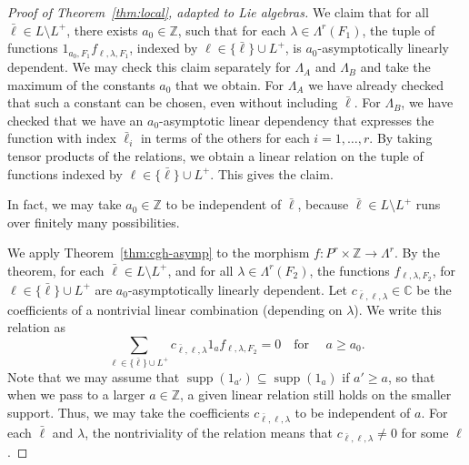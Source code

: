 \documentclass[12pt]{amsart}
\newcommand{\op}[1]{\operatorname{#1}}
\newcommand{\ring}[1]{{\mathbb #1}}
\theoremstyle{plain}
\theoremstyle{definition}
\begin{document}
\begin{proof}[Proof of Theorem~\ref{thm:local}, adapted to Lie algebras]
We claim that for all ${\bar\ell} \in L\setminus L^+$, there exists
$a_0\in\ring{Z}$, such that for each $\lambda\in \Lambda^r(F_1)$, the
tuple of functions $1_{a_0,F_1}f_{\ell,\lambda,F_1}$, indexed by
$\ell\in \{{\bar\ell}\}\cup L^+$, is $a_0$-asymptotically linearly
dependent.  We may check this claim separately for $\Lambda_A$ and
$\Lambda_B$ and take the maximum of the constants $a_0$ that we
obtain.  For $\Lambda_A$ we have already checked that such a constant
can be chosen, even without including $\bar\ell$.  For $\Lambda_B$, we
have checked that we have an $a_0$-asymptotic linear dependency that
expresses the function with index $\bar\ell_i$ in terms of the others
for each $i=1,\ldots,r$. By taking tensor products of the relations,
we obtain a linear relation on the tuple of functions indexed by $\ell\in
\{{\bar\ell}\}\cup L^+$.  This gives the claim.

In fact, we may take $a_0\in\ring{Z}$ to be independent of $\bar\ell$,
because ${\bar\ell}\in L\setminus L^+$ runs over finitely many
possibilities.

We apply Theorem~\ref{thm:cgh-asymp} to the morphism
$f:P^r\times\ring{Z}\to \Lambda^r$.  By the theorem, for each ${\bar\ell}\in
L\setminus L^+$, and for all $\lambda\in \Lambda^r({F_2})$, the
functions $f_{\ell,\lambda,F_2}$, for $\ell\in \{{\bar\ell}\}\cup L^+$ are
$a_0$-asymptotically linearly dependent.  Let $c_{{\bar\ell},\ell,\lambda}\in
\ring{C}$ be the coefficients of a nontrivial linear combination
(depending on $\lambda$).  We write this relation as
\begin{equation}\label{eqn:du}
\sum_{\ell\in \{{\bar\ell}\}\cup L^+} c_{{\bar\ell},\ell,\lambda}1_af_{\ell,\lambda,F_2}  =
0\quad\text{for }\quad a\ge a_0.
\end{equation}
Note that we may assume that
$\op{supp}(1_{a'})\subseteq\op{supp}(1_a)$ if $a'\ge a$, so that when
we pass to a larger $a\in\ring{Z}$, a given linear relation still
holds on the smaller support. Thus, we may take the coefficients
$c_{{\bar\ell},\ell,\lambda}$ to be independent of $a$.  For each
${\bar\ell}$ and $\lambda$, the nontriviality of the relation means
that $c_{{\bar\ell},\ell,\lambda}\ne 0$ for some $\ell$.


\end{proof}
\end{document}
